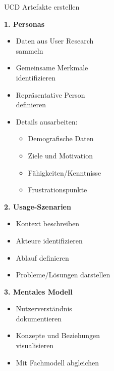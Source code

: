 \begin{KR}{UCD Artefakte erstellen}

\begin{minipage}[t]{0.45\linewidth}
\textbf{1. Personas}
\begin{itemize}
    \item Daten aus User Research\\ sammeln
    \item Gemeinsame Merkmale \\identifizieren
    \item Repräsentative Person \\definieren
    \item Details ausarbeiten:
    \begin{itemize}
        \item Demografische Daten
        \item Ziele und Motivation
        \item Fähigkeiten/Kenntnisse
        \item Frustrationspunkte
    \end{itemize}
\end{itemize}
\end{minipage}
\begin{minipage}[t]{0.5\linewidth}
\textbf{2. Usage-Szenarien}
\begin{itemize}
    \item Kontext beschreiben
    \item Akteure identifizieren
    \item Ablauf definieren
    \item Probleme/Lösungen darstellen
\end{itemize}

\textbf{3. Mentales Modell}
\begin{itemize}
    \item Nutzerverständnis\\ dokumentieren
    \item Konzepte und Beziehungen \\visualisieren
    \item Mit Fachmodell abgleichen
\end{itemize}
\end{minipage}
\end{KR}

